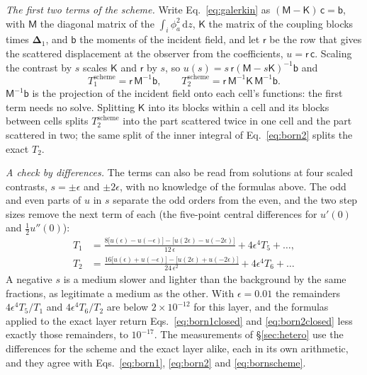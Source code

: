 \documentclass[11pt,a4paper]{article}
\newcommand{\bD}{\boldsymbol{\Delta}}
\newcommand{\dd}{\mathrm{d}}
\begin{document}
\emph{The first two terms of the scheme.} Write Eq.~\eqref{eq:galerkin} as
$(\mathsf{M}-\mathsf{K})\,\mathsf{c}=\mathsf{b}$, with $\mathsf{M}$ the diagonal matrix of the
$\int_i\phi_a^2\,\dd z$, $\mathsf{K}$ the matrix of the coupling blocks times $\bD_1$, and $\mathsf{b}$ the
moments of the incident field, and let $\mathsf{r}$ be the row that gives the scattered displacement at
the observer from the coefficients, $u=\mathsf{r}\,\mathsf{c}$. Scaling the contrast by $s$ scales
$\mathsf{K}$ and $\mathsf{r}$ by $s$, so $u(s)=s\,\mathsf{r}(\mathsf{M}-s\mathsf{K})^{-1}\mathsf{b}$ and
\begin{equation}\label{eq:bornscheme}
  T_1^{\text{scheme}}=\mathsf{r}\,\mathsf{M}^{-1}\mathsf{b},\qquad
  T_2^{\text{scheme}}=\mathsf{r}\,\mathsf{M}^{-1}\mathsf{K}\,\mathsf{M}^{-1}\mathsf{b}.
\end{equation}
$\mathsf{M}^{-1}\mathsf{b}$ is the projection of the incident field onto each cell's functions: the
first term needs no solve. Splitting $\mathsf{K}$ into its blocks within a cell and its blocks between
cells splits $T_2^{\text{scheme}}$ into the part scattered twice in one cell and the part scattered in
two; the same split of the inner integral of Eq.~\eqref{eq:born2} splits the exact $T_2$.

\emph{A check by differences.} The terms can also be read from solutions at four scaled contrasts,
$s=\pm\epsilon$ and $\pm2\epsilon$, with no knowledge of the formulas above. The odd and even parts of
$u$ in $s$ separate the odd orders from the even, and the two step sizes remove the next term of each
(the five-point central differences for $u'(0)$ and $\tfrac12u''(0)$):
\begin{equation}\label{eq:isolate}
\begin{aligned}
  T_1&=\frac{8\bigl[u(\epsilon)-u(-\epsilon)\bigr]-\bigl[u(2\epsilon)-u(-2\epsilon)\bigr]}{12\,\epsilon}
      +4\epsilon^4T_5+\dots,\\[4pt]
  T_2&=\frac{16\bigl[u(\epsilon)+u(-\epsilon)\bigr]-\bigl[u(2\epsilon)+u(-2\epsilon)\bigr]}{24\,\epsilon^2}
      +4\epsilon^4T_6+\dots
\end{aligned}
\end{equation}
A negative $s$ is a medium slower and lighter than the background by the same fractions, as legitimate
a medium as the other. With $\epsilon=0.01$ the remainders $4\epsilon^4T_5/T_1$ and $4\epsilon^4T_6/T_2$
are below $2\times10^{-12}$ for this layer, and the formulas applied to the exact layer return
Eqs.~\eqref{eq:born1closed} and \eqref{eq:born2closed} less exactly those remainders, to $10^{-17}$.
The measurements of \S\ref{sec:hetero} use the differences for the scheme and the exact layer alike, each in its own
arithmetic, and they agree with Eqs.~\eqref{eq:born1}, \eqref{eq:born2} and \eqref{eq:bornscheme}.
\end{document}
